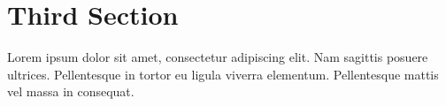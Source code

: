\par\section{Third Section}
\par\noindent Lorem ipsum dolor sit amet, consectetur adipiscing elit. Nam sagittis posuere ultrices. Pellentesque in tortor eu ligula viverra elementum. Pellentesque mattis vel massa in consequat. 